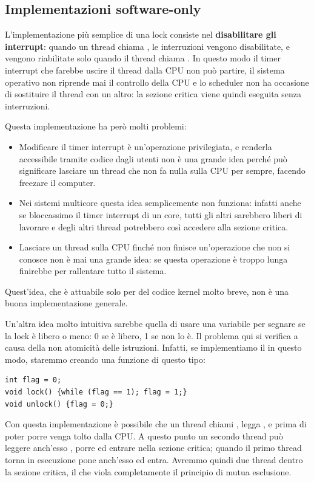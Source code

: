\documentclass[11pt, a4paper, titlepage, oneside]{scrbook}
\begin{document}
\subsection{Implementazioni software-only}

L'implementazione più semplice di una lock consiste nel \textbf{disabilitare gli interrupt}: quando un thread chiama , le interruzioni vengono disabilitate, e vengono riabilitate solo quando il thread chiama . In questo modo il timer interrupt che farebbe uscire il thread dalla CPU non può partire, il sistema operativo non riprende mai il controllo della CPU e lo scheduler non ha occasione di sostituire il thread con un altro: la sezione critica viene quindi eseguita senza interruzioni.

Questa implementazione ha però molti problemi:
\begin{itemize}
    \item Modificare il timer interrupt è un'operazione privilegiata, e renderla accessibile tramite codice dagli utenti non è una grande idea perché può significare lasciare un thread che non fa nulla sulla CPU per sempre, facendo freezare il computer.
    \item Nei sistemi multicore questa idea semplicemente non funziona: infatti anche se bloccassimo il timer interrupt di un core, tutti gli altri sarebbero liberi di lavorare e degli altri thread potrebbero così accedere alla sezione critica.
    \item Lasciare un thread sulla CPU finché non finisce un'operazione che non si conosce non è mai una grande idea: se questa operazione è troppo lunga finirebbe per rallentare tutto il sistema.
\end{itemize}

Quest'idea, che è attuabile solo per del codice kernel molto breve, non è una buona implementazione generale.

Un'altra idea molto intuitiva sarebbe quella di usare una variabile  per segnare se la lock è libero o meno: 0 se è libero, 1 se non lo è. Il problema qui si verifica a causa della non atomicità delle istruzioni. Infatti, se implementiamo il  in questo modo, staremmo creando una funzione di questo tipo:
\begin{lstlisting}[style=C]
int flag = 0;
void lock() {while (flag == 1); flag = 1;}
void unlock() {flag = 0;}
\end{lstlisting}
Con questa implementazione è possibile che un thread chiami , legga , e prima di poter porre  venga tolto dalla CPU. A questo punto un secondo thread può leggere anch'esso , porre  ed entrare nella sezione critica; quando il primo thread torna in esecuzione pone anch'esso  ed entra. Avremmo quindi due thread dentro la sezione critica, il che viola completamente il principio di mutua esclusione. 
\end{document}
